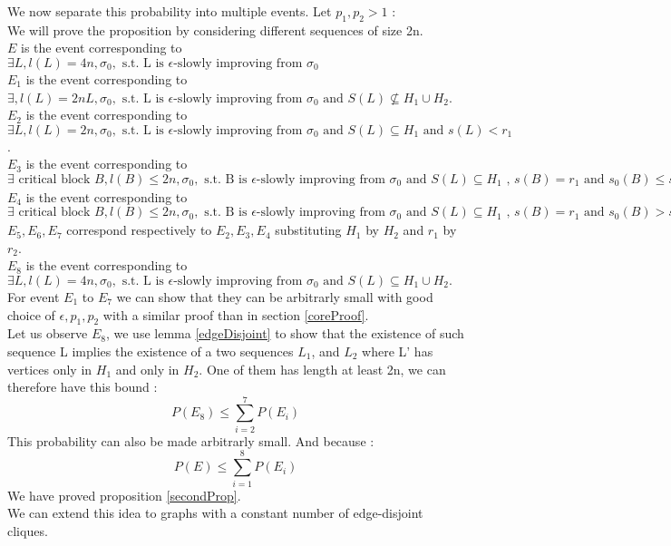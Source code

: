 \documentclass[12pt]{article}
\begin{document}
We now separate this probability into multiple events.
Let $p_1, p_2 > 1$ : \\
We will prove the proposition by considering different sequences of size 2n.\\
$E$ is the event corresponding to $\exists L, l(L) = 4n, \sigma_0, \text{ s.t. L is }\epsilon\text{-slowly improving from }\sigma_0 $\\
$E_1$ is the event corresponding to $\exists, l(L) = 2n L, \sigma_0, \text{ s.t. L is }\epsilon\text{-slowly improving from }\sigma_0 \text{ and }S(L) \not\subseteq H_1 \cup H_2$.\\
$E_2$ is the event corresponding to $\exists L, l(L) = 2n, \sigma_0,\text{ s.t. L is }\epsilon\text{-slowly improving from }\sigma_0\text{ and }S(L) \subseteq H_1\text{ and }s(L) < r_1$. \\
$E_3$   is the event corresponding to $\exists \text{ critical block } B, l(B) \leq 2n, \sigma_0,\text{ s.t. B is }\epsilon\text{-slowly improving from }\sigma_0\text{ and }S(L) \subseteq H_1 \text{ , } s(B) = r_1 \text{ and } s_0(B) \leq s(B) / p_1$ \\
$E_4$   is the event corresponding to $\exists \text{ critical block } B, l(B) \leq 2n, \sigma_0,\text{ s.t. B is }\epsilon\text{-slowly improving from }\sigma_0\text{ and }S(L) \subseteq H_1 \text{ , } s(B) = r_1 \text{ and } s_0(B) > s(B) / p_1$ \\
$E_5, E_6, E_7$ correspond respectively to $E_2, E_3, E_4$ substituting $H_1$ by $H_2$ and $r_1$ by $r_2$.\\
$E_8$  is the event corresponding to $\exists L, l(L) = 4n, \sigma_0,\text{ s.t. L is }\epsilon\text{-slowly improving from }\sigma_0\text{ and }S(L) \subseteq H_1\cup H_2.$ \\
For event $E_1$ to $E_7$ we can show that they can be arbitrarly small with good choice of $\epsilon, p_1, p_2$ with a similar proof than in section \ref{coreProof}.\\
Let us observe $E_8$, we use lemma \ref{edgeDisjoint} to show that the existence of such sequence L implies the existence of a two sequences $L_1$, and $L_2$ where L' has vertices only in $H_1$ and  only in $H_2$. One of them has length at least 2n, we can therefore have this bound :
\begin{equation*}
P(E_8) \leq \sum_{i = 2}^7 P(E_i)
\end{equation*} 
This probability can also be made arbitrarly small.  And because :
\begin{equation*}
P(E) \leq \sum_{i = 1}^8 P(E_i)
\end{equation*} 
We have proved proposition \ref{secondProp}. \\
We can extend this idea to graphs with a constant number of edge-disjoint cliques.
\end{document}
